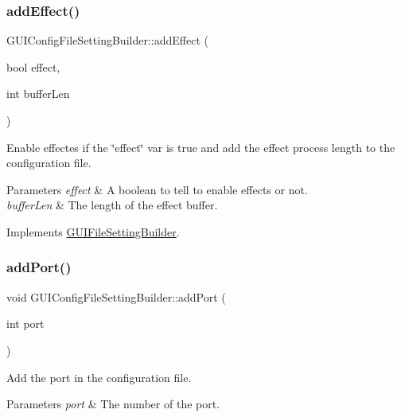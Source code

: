 \subsubsection{\texorpdfstring{add\+Effect()}{addEffect()}}
{\footnotesize\ttfamily G\+U\+I\+Config\+File\+Setting\+Builder\+::add\+Effect (\begin{DoxyParamCaption}\item[{bool}]{effect,  }\item[{int}]{buffer\+Len }\end{DoxyParamCaption})\hspace{0.3cm}{\ttfamily [virtual]}}



Enable effectes if the \char`\"{}effect\char`\"{} var is true and add the effect process length to the configuration file. 


\begin{DoxyParams}{Parameters}
{\em effect} & A boolean to tell to enable effects or not. \\
\hline
{\em buffer\+Len} & The length of the effect buffer. \\
\hline
\end{DoxyParams}


Implements \mbox{\hyperlink{class_g_u_i_file_setting_builder_aac6a7c5d7d56144ad40e9dcacb4b17d6}{G\+U\+I\+File\+Setting\+Builder}}.

\mbox{\label{class_g_u_i_config_file_setting_builder_aadf2b48c000de4e7dc8d060d486a81b7}} 
\subsubsection{\texorpdfstring{add\+Port()}{addPort()}}
{\footnotesize\ttfamily void G\+U\+I\+Config\+File\+Setting\+Builder\+::add\+Port (\begin{DoxyParamCaption}\item[{int}]{port }\end{DoxyParamCaption})\hspace{0.3cm}{\ttfamily [virtual]}}



Add the port in the configuration file. 


\begin{DoxyParams}{Parameters}
{\em port} & The number of the port. \\
\hline
\end{DoxyParams}


